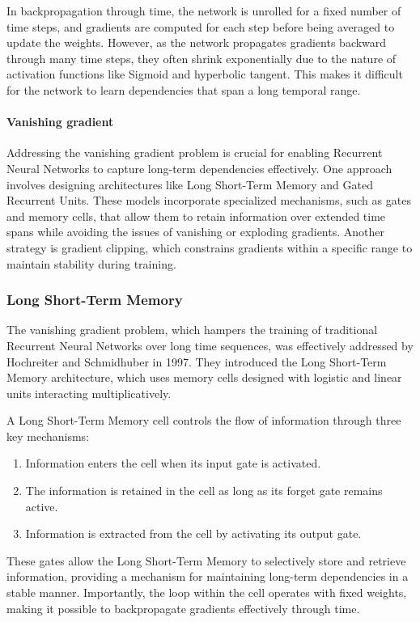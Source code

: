 In backpropagation through time, the network is unrolled for a fixed number of time steps, and gradients are computed for each step before being averaged to update the weights.
However, as the network propagates gradients backward through many time steps, they often shrink exponentially due to the nature of activation functions like Sigmoid and hyperbolic tangent. 
This makes it difficult for the network to learn dependencies that span a long temporal range.

\paragraph*{Vanishing gradient}
Addressing the vanishing gradient problem is crucial for enabling Recurrent Neural Networks to capture long-term dependencies effectively. 
One approach involves designing architectures like Long Short-Term Memory and Gated Recurrent Units. 
These models incorporate specialized mechanisms, such as gates and memory cells, that allow them to retain information over extended time spans while avoiding the issues of vanishing or exploding gradients. 
Another strategy is gradient clipping, which constrains gradients within a specific range to maintain stability during training.

\subsubsection{Long Short-Term Memory}
The vanishing gradient problem, which hampers the training of traditional Recurrent Neural Networks over long time sequences, was effectively addressed by Hochreiter and Schmidhuber in 1997. 
They introduced the Long Short-Term Memory architecture, which uses memory cells designed with logistic and linear units interacting multiplicatively.

A Long Short-Term Memory cell controls the flow of information through three key mechanisms:
\begin{enumerate}
    \item Information enters the cell when its input gate is activated.
    \item The information is retained in the cell as long as its forget gate remains active.
    \item Information is extracted from the cell by activating its output gate.
\end{enumerate}
These gates allow the Long Short-Term Memory to selectively store and retrieve information, providing a mechanism for maintaining long-term dependencies in a stable manner.
Importantly, the loop within the cell operates with fixed weights, making it possible to backpropagate gradients effectively through time.

